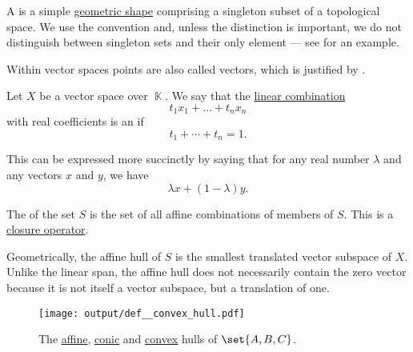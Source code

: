 \begin{definition}\label{def:point}
  A  is a simple \hyperref[def:geometric_shape]{geometric shape} comprising a singleton subset of a topological space. We use the convention  and, unless the distinction is important, we do not distinguish between singleton sets and their only element --- see  for an example.

  Within vector spaces points are also called vectors, which is justified by .
\end{definition}

\begin{definition}\label{def:affine_hull}\mimprovised
  Let \( X \) be a vector space over \( \BbbK \). We say that the \hyperref[rem:linear_combinations]{linear combination}
  \begin{equation*}
    t_1 x_1 + \ldots + t_n x_n
  \end{equation*}
  with real coefficients is an  if
  \begin{equation*}
    t_1 + \cdots + t_n = 1.
  \end{equation*}

  This can be expressed more succinctly by saying that for any real number \( \lambda \) and any vectors \( x \) and \( y \), we have
  \begin{equation}\label{eq:def:affine_hull/combination}
    \lambda x + (1 - \lambda) y.
  \end{equation}

  The  of the set \( S \) is the set of all affine combinations of members of \( S \). This is a \hyperref[def:closure_operator]{closure operator}.

  Geometrically, the affine hull of \( S \) is the smallest translated vector subspace of \( X \). Unlike the linear span, the affine hull does not necessarily contain the zero vector because it is not itself a vector subspace, but a translation of one.

  \begin{figure}[!ht]
    \centering
    \texttt{[image: output/def\_\_convex\_hull.pdf]}
    \caption{The \hyperref[def:affine_hull]{affine}, \hyperref[def:conic_hull]{conic} and \hyperref[def:convex_hull]{convex} hulls of \( \set{ A, B, C } \).}\label{fig:def:convex_hull}
  \end{figure}
\end{definition}
